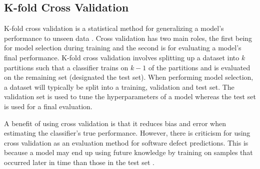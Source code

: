 \documentclass[../main.tex]{subfiles}
\begin{document}
\subsection{K-fold Cross Validation}

K-fold cross validation is a statistical method for generalizing a model's performance to unseen data \cite{kale2011cross}. Cross validation has two main roles, the first being for model selection during training and the second is for evaluating a model's final performance. K-fold cross validation involves splitting up a dataset into $k$ partitions such that a classifier trains on $k-1$ of the partitions and is evaluated on the remaining set (designated the test set). When performing model selection, a dataset will typically be split into a training, validation and test set. The validation set is used to tune the hyperparameters of a model whereas the test set is used for a final evaluation.

A benefit of using cross validation is that it reduces bias and error when estimating the classifier's true performance. However, there is criticism for using cross validation as an evaluation method for software defect predictions. This is because a model may end up using future knowledge by training on samples that occurred later in time than those in the test set \cite{tan2015online}. 

\end{document}
